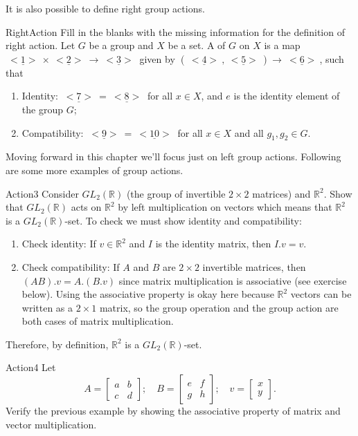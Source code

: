 It is also possible to define right group actions.

\begin{exercise}{RightAction}
Fill in the blanks with the missing information for the definition of right action. Let $G$ be a group and $X$ be a set. A  of $G$ on $X$ is a map $\underline{~<1>~}\times \underline{~<2>~}\rightarrow \underline{~<3>~}$ given by $(\underline{~<4>~}, \underline{~<5>~})\rightarrow \underline{~<6>~}$, such that
\begin{enumerate}[(1)]
\item Identity: $\underline{~<7>~}=\underline{~<8>~}$ for all $x\in X$, and $e$ is the identity element of the group $G$;
\item Compatibility: $\underline{~<9>~}=\underline{~<10>~}$ for all $x\in X$ and all $g_1, g_2 \in G$.
\end{enumerate}
\end{exercise}

Moving forward in this chapter we'll focus just on left group actions.  Following are some more examples of group actions.

\begin{example}{Action3}
Consider $GL_2(\mathbb{R})$ (the group of invertible $2 \times 2$ matrices) and $\mathbb{R}^2$. Show that $GL_2(\mathbb{R})$ acts on $\mathbb{R}^2$ by left multiplication on vectors which means that $\mathbb{R}^2$ is a $GL_2(\mathbb{R})$-set. To check we must show identity and compatibility:
\begin{enumerate}[(1)]
\item Check identity: If $v\in \mathbb{R}^2$ and $I$ is the identity matrix, then $I.v = v$. 
\item Check compatibility: If $A$ and $B$ are $2 \times 2$ invertible matrices, then $(AB).v = A.(B.v)$ since matrix multiplication is associative (see exercise below). Using the associative property is okay here because $\mathbb{R}^2$ vectors can be written as a $2 \times 1$ matrix, so the group operation and the group action are both cases of matrix multiplication. 
\end{enumerate}
Therefore, by definition, $\mathbb{R}^2$ is a $GL_2(\mathbb{R})$-set.
\end{example}

\begin{exercise}{Action4}
Let
\begin{equation*}
A=\left[\begin{array}{cc}
a&b\\c&d\end{array}\right]; \quad 
B=\left[\begin{array}{cc} e& f\\ g & h\end{array}\right]; \quad 
v=\left[\begin{array}{c}x\\ y\end{array}\right].
\end{equation*}
Verify the previous example by showing the associative property of matrix and vector multiplication. 
\end {exercise}


